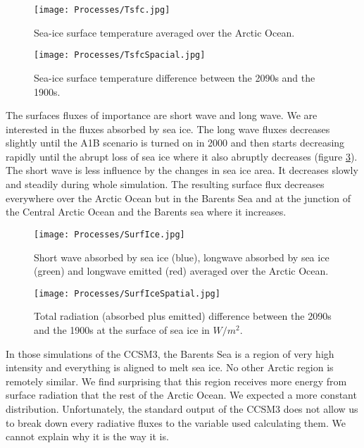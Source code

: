 \begin{figure}
\center
\noindent\texttt{[image: Processes/Tsfc.jpg]}
\caption{Sea-ice surface temperature averaged over the Arctic Ocean.}
\label{Tsfcg1}
\end{figure}

\begin{figure}
\center
\noindent\texttt{[image: Processes/TsfcSpacial.jpg]}
\caption{Sea-ice surface temperature difference between the 2090s and the 1900s.}
\label{Tsfcg2}
\end{figure}

The surfaces fluxes of importance are short wave and long wave. We are interested in the fluxes absorbed by sea ice. The long wave fluxes decreases slightly until the A1B scenario is turned on in 2000 and then starts decreasing rapidly until the abrupt loss of sea ice where it also abruptly decreases (figure \ref{SurfIce}). The short wave is less influence by the changes in sea ice area. It decreases slowly and steadily during whole simulation. The resulting surface flux decreases everywhere over the Arctic Ocean but in the Barents Sea and at the junction of the Central Arctic Ocean and the Barents sea where it increases. 

\begin{figure}
\center
\noindent\texttt{[image: Processes/SurfIce.jpg]}
\caption{Short wave absorbed by sea ice (blue), longwave absorbed by sea ice (green) and longwave emitted (red) averaged over the Arctic Ocean.}
\label{SurfIce}
\end{figure}

\begin{figure}
\center
\noindent\texttt{[image: Processes/SurfIceSpatial.jpg]}
\caption{Total radiation (absorbed plus emitted) difference between the 2090s and the 1900s at the surface of sea ice in $W/m^2$.}
\label{SurfIce2}
\end{figure}

In those simulations of the CCSM3, the Barents Sea is a region of very high intensity and everything is aligned to melt sea ice. No other Arctic region is remotely similar. We find surprising that this region receives more energy from surface radiation that the rest of the Arctic Ocean. We expected a more constant distribution. Unfortunately, the standard output of the CCSM3 does not allow us to break down every radiative fluxes to the variable used calculating them. We cannot explain why it is the way it is. 



